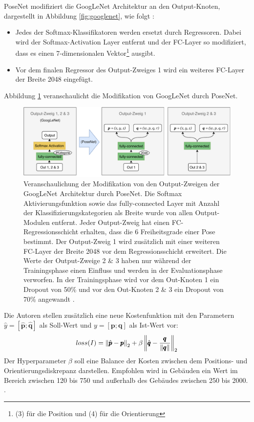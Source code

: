 PoseNet modifiziert die GoogLeNet Architektur an den Output-Knoten, dargestellt in Abbildung \ref{fig:googlenet}, wie folgt \cite{kendallPoseNetConvolutionalNetwork2015}:
\begin{itemize}
	\item Jedes der Softmax-Klassifikatoren werden ersetzt durch Regressoren. Dabei wird der Softmax-Activation Layer entfernt und der FC-Layer so modifiziert, dass es einen 7-dimensionalen Vektor\footnote{(3) für die Position und (4) für die Orientierung} ausgibt.
	\item Vor dem finalen Regressor des Output-Zweiges 1 wird ein weiteres FC-Layer der Breite 2048 eingefügt.

\end{itemize}
Abbildung \ref{fig:posenet_mods} veranschaulicht die Modifikation von GoogLeNet durch PoseNet.
 \begin{figure}
	\centering
	\includegraphics[width=\textwidth]{images/googlenet/posenet_diagram2.pdf}
	\caption{Veranschaulichung der Modifikation von den Output-Zweigen der GoogLeNet Architektur durch PoseNet. Die Softmax Aktivierungsfunktion sowie das fully-connected Layer mit Anzahl der Klassifizierungskategorien als Breite wurde von allen Output-Modulen entfernt. Jeder Output-Zweig hat einen FC-Regressionsschicht erhalten, dass die 6 Freiheitsgrade einer Pose bestimmt. Der Output-Zweig 1 wird zusätzlich mit einer weiteren FC-Layer der Breite 2048 vor dem Regressionsschicht erweitert. Die Werte der Output-Zweige 2 \& 3 haben nur während der Trainingsphase einen Einfluss und werden in der Evaluationsphase verworfen. In der Trainingsphase wird vor dem Out-Knoten 1 ein Dropout von 50\% und vor den Out-Knoten 2 \& 3 ein Dropout von 70\% angewandt \cite{kendallPoseNetConvolutionalNetwork2015}.}
	\label{fig:posenet_mods}
\end{figure}

Die Autoren \citet{kendallPoseNetConvolutionalNetwork2015} stellen zusätzlich eine neue Kostenfunktion mit den Parametern $\hat{y} = [\hat{\pmb{p}};\hat{\pmb{q}}]$ als Soll-Wert und $y = [\pmb{p};\pmb{q}]$ als Ist-Wert vor:
\begin{equation}
	\label{eq:posenet_loss}
	loss(I) = \left\lVert \hat{\pmb{p}} - \pmb{p} \right\rVert_2 + \beta \left\lVert \hat{\pmb{q}} - \frac{\pmb{q}}{\left\lVert\pmb{q}\right\rVert}\right\rVert_2
\end{equation}
Der Hyperparameter $\beta$ soll eine Balance der Kosten zwischen dem Positions- und Orientierungsdiskrepanz darstellen. Empfohlen wird in Gebäuden ein Wert im Bereich zwischen 120 bis 750 und außerhalb des Gebäudes zwischen 250 bis 2000. \cite{kendallPoseNetConvolutionalNetwork2015}. 